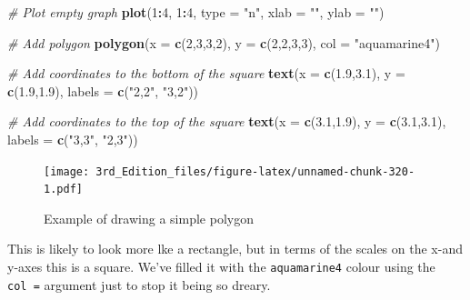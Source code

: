 \documentclass[
]{book}
\newenvironment{Shaded}{\begin{snugshade}}{\end{snugshade}}
\newcommand{\CommentTok}[1]{\textcolor[rgb]{0.56,0.35,0.01}{\textit{#1}}}
\newcommand{\DataTypeTok}[1]{\textcolor[rgb]{0.13,0.29,0.53}{#1}}
\newcommand{\DecValTok}[1]{\textcolor[rgb]{0.00,0.00,0.81}{#1}}
\newcommand{\FloatTok}[1]{\textcolor[rgb]{0.00,0.00,0.81}{#1}}
\newcommand{\KeywordTok}[1]{\textcolor[rgb]{0.13,0.29,0.53}{\textbf{#1}}}
\newcommand{\NormalTok}[1]{#1}
\newcommand{\OperatorTok}[1]{\textcolor[rgb]{0.81,0.36,0.00}{\textbf{#1}}}
\newcommand{\StringTok}[1]{\textcolor[rgb]{0.31,0.60,0.02}{#1}}
\begin{document}
\begin{Shaded}
\begin{Highlighting}[]

\CommentTok{# Plot empty graph}
\KeywordTok{plot}\NormalTok{(}\DecValTok{1}\OperatorTok{:}\DecValTok{4}\NormalTok{, }\DecValTok{1}\OperatorTok{:}\DecValTok{4}\NormalTok{, }
     \DataTypeTok{type =} \StringTok{"n"}\NormalTok{, }
     \DataTypeTok{xlab =} \StringTok{""}\NormalTok{, }
     \DataTypeTok{ylab =} \StringTok{""}\NormalTok{)}

\CommentTok{# Add polygon}
\KeywordTok{polygon}\NormalTok{(}\DataTypeTok{x =} \KeywordTok{c}\NormalTok{(}\DecValTok{2}\NormalTok{,}\DecValTok{3}\NormalTok{,}\DecValTok{3}\NormalTok{,}\DecValTok{2}\NormalTok{), }
        \DataTypeTok{y =} \KeywordTok{c}\NormalTok{(}\DecValTok{2}\NormalTok{,}\DecValTok{2}\NormalTok{,}\DecValTok{3}\NormalTok{,}\DecValTok{3}\NormalTok{),}
        \DataTypeTok{col =} \StringTok{"aquamarine4"}\NormalTok{)}

\CommentTok{# Add coordinates to the bottom of the square}
\KeywordTok{text}\NormalTok{(}\DataTypeTok{x =} \KeywordTok{c}\NormalTok{(}\FloatTok{1.9}\NormalTok{,}\FloatTok{3.1}\NormalTok{), }
        \DataTypeTok{y =} \KeywordTok{c}\NormalTok{(}\FloatTok{1.9}\NormalTok{,}\FloatTok{1.9}\NormalTok{), }
        \DataTypeTok{labels =} \KeywordTok{c}\NormalTok{(}\StringTok{"2,2"}\NormalTok{, }\StringTok{"3,2"}\NormalTok{))}

\CommentTok{# Add coordinates to the top of the square}
\KeywordTok{text}\NormalTok{(}\DataTypeTok{x =} \KeywordTok{c}\NormalTok{(}\FloatTok{3.1}\NormalTok{,}\FloatTok{1.9}\NormalTok{), }
        \DataTypeTok{y =} \KeywordTok{c}\NormalTok{(}\FloatTok{3.1}\NormalTok{,}\FloatTok{3.1}\NormalTok{), }
        \DataTypeTok{labels =} \KeywordTok{c}\NormalTok{(}\StringTok{"3,3"}\NormalTok{, }\StringTok{"2,3"}\NormalTok{))}
\end{Highlighting}
\end{Shaded}

\begin{figure}
\centering
\texttt{[image: 3rd\_Edition\_files/figure-latex/unnamed-chunk-320-1.pdf]}
\caption{\label{fig:unnamed-chunk-320}Example of drawing a simple polygon}
\end{figure}

This is likely to look more lke a rectangle, but in terms of the scales on the x-and y-axes this is a square. We've filled it with the \texttt{aquamarine4} colour using the \texttt{col\ =} argument just to stop it being so dreary.
\end{document}
